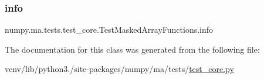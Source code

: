 \subsubsection{\texorpdfstring{info}{info}}
{\footnotesize\ttfamily numpy.\+ma.\+tests.\+test\+\_\+core.\+Test\+Masked\+Array\+Functions.\+info}



The documentation for this class was generated from the following file\+:\begin{DoxyCompactItemize}
\item 
venv/lib/python3./site-\/packages/numpy/ma/tests/\hyperlink{numpy_2ma_2tests_2test__core_8py}{test\+\_\+core.\+py}\end{DoxyCompactItemize}
